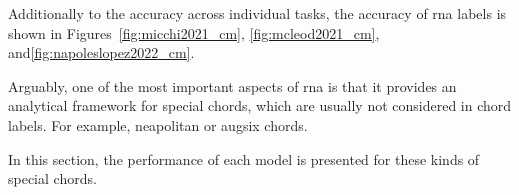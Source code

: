



Additionally to the accuracy across individual tasks, the
accuracy of \gls{rna} labels is shown in
Figures~\ref{fig:micchi2021_cm}, \ref{fig:mcleod2021_cm},
and\ref{fig:napoleslopez2022_cm}.


Arguably, one of the most important aspects of \gls{rna} is
that it provides an analytical framework for special chords,
which are usually not considered in chord labels. For
example, \gls{neapolitan} or \gls{augsix} chords.

In this section, the performance of each model is presented
for these kinds of special chords.

